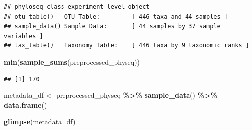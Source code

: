 \documentclass[
]{article}
\newenvironment{Shaded}{\begin{snugshade}}{\end{snugshade}}
\newcommand{\FunctionTok}[1]{\textcolor[rgb]{0.13,0.29,0.53}{\textbf{#1}}}
\newcommand{\NormalTok}[1]{#1}
\newcommand{\OtherTok}[1]{\textcolor[rgb]{0.56,0.35,0.01}{#1}}
\newcommand{\SpecialCharTok}[1]{\textcolor[rgb]{0.81,0.36,0.00}{\textbf{#1}}}
\begin{document}
\begin{verbatim}
## phyloseq-class experiment-level object
## otu_table()   OTU Table:         [ 446 taxa and 44 samples ]
## sample_data() Sample Data:       [ 44 samples by 37 sample variables ]
## tax_table()   Taxonomy Table:    [ 446 taxa by 9 taxonomic ranks ]
\end{verbatim}

\begin{Shaded}
\begin{Highlighting}[]
\FunctionTok{min}\NormalTok{(}\FunctionTok{sample\_sums}\NormalTok{(preprocessed\_physeq))}
\end{Highlighting}
\end{Shaded}

\begin{verbatim}
## [1] 170
\end{verbatim}

\begin{Shaded}
\begin{Highlighting}[]
\NormalTok{metadata\_df }\OtherTok{\textless{}{-}} 
\NormalTok{  preprocessed\_physeq }\SpecialCharTok{\%\textgreater{}\%}
  \FunctionTok{sample\_data}\NormalTok{() }\SpecialCharTok{\%\textgreater{}\%}
  \FunctionTok{data.frame}\NormalTok{()}


\FunctionTok{glimpse}\NormalTok{(metadata\_df)}
\end{Highlighting}
\end{Shaded}
\end{document}
